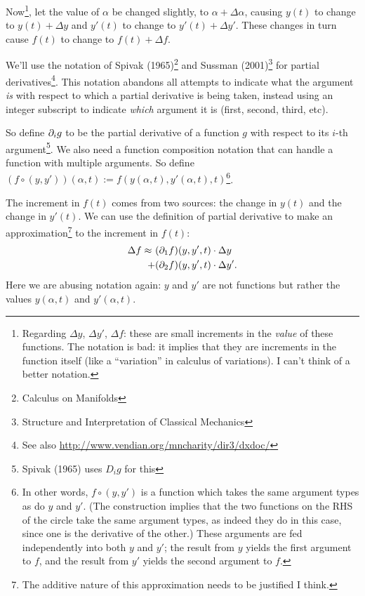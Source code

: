 Now\footnote{Regarding $\Delta y$, $\Delta y'$, $\Delta f$: these are small increments in the
  \emph{value} of these functions. The notation is bad: it implies that they are increments in the
  function itself (like a ``variation'' in calculus of variations). I can't think of a better
  notation.}, let the value of $\alpha$ be changed slightly, to $\alpha + \Delta\alpha$, causing
$y(t)$ to change to $y(t) + \Delta y$ and $y'(t)$ to change to $y'(t) + \Delta y'$. These changes in
turn cause $f(t)$ to change to $f(t) + \Delta f$.

We'll use the notation of Spivak (1965)\footnote{Calculus on Manifolds} and Sussman
(2001)\footnote{Structure and Interpretation of Classical Mechanics} for partial
derivatives\footnote{See also \url{http://www.vendian.org/mncharity/dir3/dxdoc/}}. This notation
abandons all attempts to indicate what the argument \emph{is} with respect to which a partial
derivative is being taken, instead using an integer subscript to indicate \emph{which} argument it
is (first, second, third, etc).

So define $\partial_i g$ to be the partial derivative of a function $g$ with respect to its $i$-th
argument\footnote{Spivak (1965) uses $D_i g$ for this}. We also need a function composition notation
that can handle a function with multiple arguments. So define
${(f \circ (y, y'))(\alpha, t) := f(y(\alpha, t), y'(\alpha, t), t)}$\footnote{In other words,
  $f \circ (y, y')$ is a function which takes the same argument types as do $y$ and $y'$. (The
  construction implies that the two functions on the RHS of the circle take the same argument types,
  as indeed they do in this case, since one is the derivative of the other.) These arguments are fed
  independently into both $y$ and $y'$; the result from $y$ yields the first argument to $f$, and
  the result from $y'$ yields the second argument to $f$.}.

The increment in $f(t)$ comes from two sources: the change in $y(t)$ and the change in $y'(t)$. We
can use the definition of partial derivative to make an approximation\footnote{The additive nature
  of this approximation needs to be justified I think.} to the increment in $f(t)$:
\begin{align*}
  \Delta f \approx ~ &(\partial_1 f)(y, y', t) \cdot \Delta y \\
                 +   &(\partial_2 f)(y, y', t) \cdot \Delta y'.
\end{align*}
Here we are abusing notation again: $y$ and $y'$ are not functions but rather the values $y(\alpha, t)$
and $y'(\alpha, t)$.

